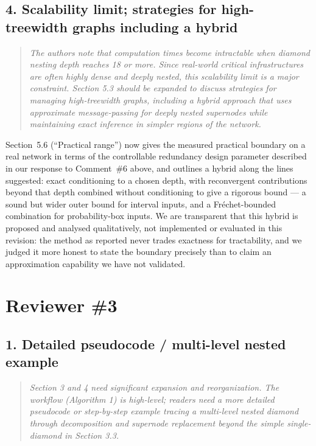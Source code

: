 \documentclass[11pt]{article}
\newenvironment{revcomment}
  {\begin{quote}\itshape\color{gray!60!black}}
  {\end{quote}}
\begin{document}
\subsection*{4. Scalability limit; strategies for high-treewidth graphs including a hybrid}
\begin{revcomment}
The authors note that computation times become intractable when diamond nesting depth reaches 18 or more. Since real-world critical infrastructures are often highly dense and deeply nested, this scalability limit is a major constraint. Section 5.3 should be expanded to discuss strategies for managing high-treewidth graphs, including a hybrid approach that uses approximate message-passing for deeply nested supernodes while maintaining exact inference in simpler regions of the network.
\end{revcomment}

Section~5.6 (``Practical range'') now gives the measured practical boundary on a real network in terms of the controllable redundancy design parameter described in our response to Comment~\#6 above, and outlines a hybrid along the lines suggested: exact conditioning to a chosen depth, with reconvergent contributions beyond that depth combined without conditioning to give a rigorous bound --- a sound but wider outer bound for interval inputs, and a Fr\'echet-bounded combination for probability-box inputs. We are transparent that this hybrid is proposed and analysed qualitatively, not implemented or evaluated in this revision: the method as reported never trades exactness for tractability, and we judged it more honest to state the boundary precisely than to claim an approximation capability we have not validated.

\section*{Reviewer \#3}

\subsection*{1. Detailed pseudocode / multi-level nested example}
\begin{revcomment}
Section 3 and 4 need significant expansion and reorganization. The workflow (Algorithm 1) is high-level; readers need a more detailed pseudocode or step-by-step example tracing a multi-level nested diamond through decomposition and supernode replacement beyond the simple single-diamond in Section 3.3.
\end{revcomment}
\end{document}
